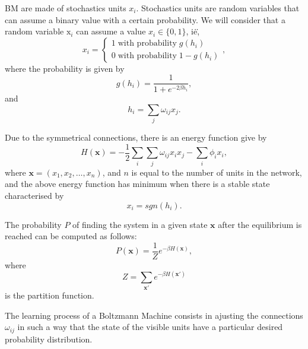 BM are made of stochastics units $x_{i}$.
Stochastics units are random variables that can assume a binary value with a certain probability. 
We will consider that a random variable $\mathrm{x}_{i}$ can assume a value $x_{i} \in \{0, 1\}$, i\. e\.,
\begin{equation}
  x_{i} =
    \begin{cases}
      1 \; \text{with probability} \; g(h_{i}) \\
      0 \; \text{with probability} \; 1 - g(h_{i})
    \end{cases},
  \label{eq:stochastic-unit-values}
\end{equation}
where the probability is given by
\begin{equation}
  g(h_{i}) = \frac{1}{1 + e^{-2 \beta h_{i}}},
  \label{eq:stochastic-unit-prob}
\end{equation}
and
\begin{equation}
  h_{i} = \sum_{j}\omega_{ij}x_{j}.
  \label{eq:stochastic-unit-input}
\end{equation}

Due to the symmetrical connections, there is an energy function give by
\begin{equation}
  H(\mathbf{x}) = - \frac{1}{2} \sum_{i} \sum_{j} \omega_{ij}x_{i}x_{j} - \sum_{i} \phi_{i}x_{i},
  \label{eq:eq4}
\end{equation}
where $\mathbf{x} = (x_{1}, x_{2}, \dots, x_{n})$, and $n$ is equal to the number of units in the network, and the above energy function has minimum when there is a stable state characterised by
\begin{equation}
  x_{i} = sgn(h_{i}).
  \label{eq:eq5}
\end{equation}

The probability $P$ of finding the system in a given state $\mathbf{x}$ after the equilibrium is reached can be computed as follows:
\begin{equation}
  P(\mathbf{x}) = \frac{1}{Z} e^{-\beta H(\mathbf{x})},
  \label{eq:eq6}
\end{equation}
where
\begin{equation}
  Z = \sum_{\mathbf{x}'} e^{-\beta H(\mathbf{x}')}
  \label{eq:eq7}
\end{equation}
is the partition function.

The learning process of a Boltzmann Machine consists in ajusting the connections $\omega_{ij}$ in such a way that the state of the visible units have a particular desired probability distribution.

